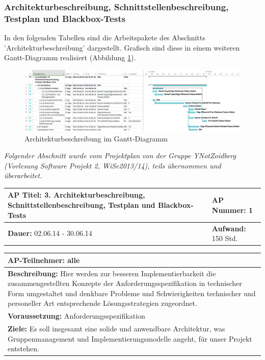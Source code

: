 \documentclass[fontsize=12pt,paper=a4,twoside]{scrartcl}
\begin{document}
\subsubsection{Architekturbeschreibung, Schnittstellenbeschreibung, Testplan und Blackbox-Tests}\label{aps}

In den folgenden Tabellen sind die Arbeitspakete des Abschnitts 'Architekturbeschreibung' dargestellt. Grafisch sind diese in einem weiteren Gantt-Diagramm realisiert (Abbildung \ref{Gantt-AB}).

\newpage
\begin{figure}[!h]
\includegraphics[angle = 90, scale=0.35]{gantt_ab.jpg}
\caption{Architekturbeschreibung im Gantt-Diagramm}
\label{Gantt-AB}
\end{figure}
\newpage

\textit{Folgender Abschnitt wurde vom Projektplan von der Gruppe YNotZoidberg (Vorlesung Software Projekt 2, WiSe2013/14), teils übernommen und überarbeitet.}

\begin{tabular}{|p{7.43cm}|p{7.43cm}|}
\hline
\textbf{AP Titel: }3. Architekturbeschreibung, Schnittstellenbeschreibung, Testplan und Blackbox-Tests & \textbf{AP Nummer: }1\\ 
\hline
\textbf{Dauer: }02.06.14 - 30.06.14& \textbf{Aufwand: }150 Std.\\
\hline
\end{tabular}
\begin{tabular}{|p{15.3cm}|}
\hline
\textbf{AP-Teilnehmer: }alle\\
\hline
\textbf{Beschreibung: }Hier werden zur besseren Implementierbarkeit die zusammengestellten Konzepte der Anforderungsspezifikation in technischer Form umgestaltet und denkbare Probleme und Schwierigkeiten technischer und personeller Art entsprechende Lösungsstrategien zugeordnet.  \\
\hline
\textbf{Voraussetzung: }Anforderungsspezifikation\\
\hline 
\textbf{Ziele: }Es soll insgesamt eine solide und anwendbare Architektur, was Gruppenmanagement und Implementierungsmodelle angeht,  für unser Projekt entstehen.\\
\hline 
\end{tabular}
\begin{verbatim}

\end{verbatim}
\end{document}
